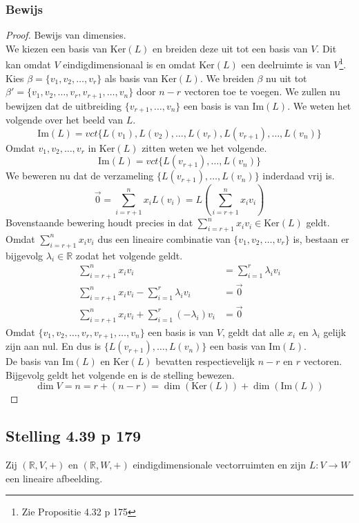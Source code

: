 \documentclass[lineaire_algebra_oplossingen.tex]{subfiles}
\begin{document}
\subsubsection*{Bewijs}
\begin{proof}
Bewijs van dimensies.\\
We kiezen een basis van $\text{Ker}(L)$ en breiden deze uit tot een basis van $V$. Dit kan omdat $V$ eindig\-dimensionaal is en omdat $\text{Ker}(L)$ een deelruimte is van $V$\footnote{Zie Propositie 4.32 p 175}. Kies $\beta = \{v_1,v_2,\ldots,v_r\}$ als basis van $\text{Ker}(L)$. We breiden $\beta$ nu uit tot $\beta'= \{v_1,v_2,\ldots,v_r,v_{r+1},\ldots,v_{n}\}$ door $n-r$ vectoren toe te voegen. 
We zullen nu bewijzen dat de uitbreiding $\{v_{r+1},\ldots,v_{n}\}$ een basis is van $\text{Im}(L)$. We weten het volgende over het beeld van $L$.
\[
\text{Im}(L) = vct\{L(v_1),L(v_2),\ldots,L(v_r),L(v_{r+1}),\ldots,L(v_{n})\}
\]
Omdat $v_1,v_2,\ldots,v_r$ in $\text{Ker}(L)$ zitten weten we het volgende.
\[
\text{Im}(L) = vct \{L(v_{r+1}),\ldots,L(v_{n})\}
\]
We beweren nu dat de verzameling $\{L(v_{r+1}),\ldots,L(v_{n})\}$ inderdaad vrij is.
\[
\vec{0}=\sum_{i=r+1}^nx_iL(v_i)=L\left(\sum_{i=r+1}^nx_iv_i\right)
\]
Bovenstaande bewering houdt precies in dat $\sum_{i=r+1}^nx_iv_i\in \text{Ker}(L)$ geldt.\\
Omdat $\sum_{i=r+1}^nx_iv_i$ dus een lineaire combinatie van $\{v_1,v_2,\ldots,v_r\}$ is, bestaan er bijgevolg $\lambda_i \in \mathbb{R}$ zodat het volgende geldt.
\begin{align*}
\sum_{i=r+1}^nx_iv_i &= \sum_{i=1}^r\lambda_iv_i \\
\sum_{i=r+1}^nx_iv_i - \sum_{i=1}^r\lambda_iv_i &= \vec{0} \\
\sum_{i=r+1}^nx_iv_i + \sum_{i=1}^r(-\lambda_i)v_i &= \vec{0}
\end{align*}
Omdat $\{v_1,v_2,\ldots,v_r,v_{r+1},\ldots,v_{n}\}$ een basis is van $V$, geldt dat alle $x_i$ en $\lambda_i$ gelijk zijn aan nul. En dus is $\{L(v_{r+1}),\ldots,L(v_{n})\}$ een basis van $\text{Im}(L)$.\\
De basis van $\text{Im}(L)$ en $\text{Ker}(L)$ bevatten respectievelijk $n-r$ en $r$ vectoren. Bijgevolg geldt het volgende en is de stelling bewezen.
\[
\dim V = n = r + (n-r) = \dim (\text{Ker}(L)) + \dim (\text{Im}(L))
\]
\end{proof}


\subsection{Stelling 4.39 p 179}
\label{4.39}
Zij $(\mathbb{R},V,+)$ en $(\mathbb{R},W,+)$ eindigdimensionale vectorruimten en zijn $L:V\rightarrow W$ een lineaire afbeelding.
\end{document}
